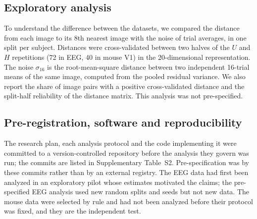 \documentclass[11pt]{article}
\begin{document}
\subsection{Exploratory analysis}\label{sec:explore}

To understand the difference between the datasets, we compared the distance from each image to its 8th nearest image with the noise of trial averages, in one split per subject.
Distances were cross-validated between two halves of the $U$ and $H$ repetitions (72 in EEG, 40 in mouse V1) in the 20-dimensional representation.
The noise $\sigma_{16}$ is the root-mean-square distance between two independent 16-trial means of the same image, computed from the pooled residual variance.
We also report the share of image pairs with a positive cross-validated distance and the split-half reliability of the distance matrix.
This analysis was not pre-specified.

\subsection{Pre-registration, software and reproducibility}\label{sec:prereg}

The research plan, each analysis protocol and the code implementing it were committed to a version-controlled repository before the analysis they govern was run; the commits are listed in Supplementary Table~S2.
Pre-specification was by these commits rather than by an external registry.
The EEG data had first been analyzed in an exploratory pilot whose estimates motivated the claims; the pre-specified EEG analysis used new random splits and seeds but not new data.
The mouse data were selected by rule and had not been analyzed before their protocol was fixed, and they are the independent test.
\end{document}
